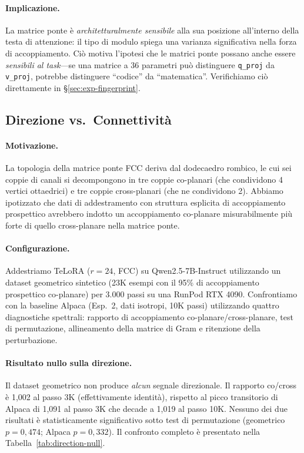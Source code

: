 \documentclass[11pt]{article}
\begin{document}
\paragraph{Implicazione.}
La matrice ponte \`e \emph{architetturalmente sensibile} alla sua
posizione all'interno della testa di attenzione: il tipo di modulo
spiega una varianza significativa nella forza di accoppiamento.
Ci\`o motiva l'ipotesi che le matrici ponte possano anche essere
\emph{sensibili al task}---se una matrice a 36 parametri pu\`o
distinguere \texttt{q\_proj} da \texttt{v\_proj}, potrebbe distinguere
``codice'' da ``matematica''.
Verifichiamo ci\`o direttamente in \S\ref{sec:exp-fingerprint}.

\subsection{Direzione vs.\ Connettivit\`a}
\label{sec:exp-direction}

\paragraph{Motivazione.}
La topologia della matrice ponte FCC deriva dal dodecaedro rombico, le
cui sei coppie di canali si decompongono in tre coppie co-planari
(che condividono 4 vertici ottaedrici) e tre coppie cross-planari
(che ne condividono 2). Abbiamo ipotizzato che dati di addestramento con
struttura esplicita di accoppiamento prospettico avrebbero indotto un
accoppiamento co-planare misurabilmente pi\`u forte di quello
cross-planare nella matrice ponte.

\paragraph{Configurazione.}
Addestriamo TeLoRA ($r\!=\!24$, FCC) su Qwen2.5-7B-Instruct
utilizzando un dataset geometrico sintetico (23K esempi con il 95\%
di accoppiamento prospettico co-planare) per 3.000 passi su una RunPod
RTX 4090. Confrontiamo con la baseline Alpaca (Esp.~2, dati isotropi,
10K passi) utilizzando quattro diagnostiche spettrali: rapporto di
accoppiamento co-planare/cross-planare, test di permutazione,
allineamento della matrice di Gram e ritenzione della perturbazione.

\paragraph{Risultato nullo sulla direzione.}
Il dataset geometrico non produce \emph{alcun} segnale direzionale. Il
rapporto co/cross \`e 1,002 al passo 3K (effettivamente identit\`a),
rispetto al picco transitorio di Alpaca di 1,091 al passo 3K che decade
a 1,019 al passo 10K. Nessuno dei due risultati \`e statisticamente
significativo sotto test di permutazione (geometrico $p = 0{,}474$;
Alpaca $p = 0{,}332$). Il confronto completo \`e presentato nella
Tabella~\ref{tab:direction-null}.
\end{document}
